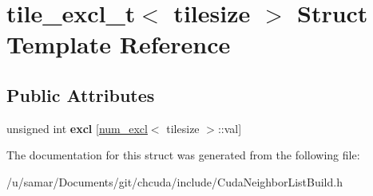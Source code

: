 \hypertarget{structtile__excl__t}{}\section{tile\+\_\+excl\+\_\+t$<$ tilesize $>$ Struct Template Reference}
\label{structtile__excl__t}
\subsection*{Public Attributes}
\begin{DoxyCompactItemize}
\item 
\hypertarget{structtile__excl__t_a3150bae21a288b5f1aaba959b3486d4f}{}\label{structtile__excl__t_a3150bae21a288b5f1aaba959b3486d4f} 
unsigned int {\bfseries excl} \mbox{[}\hyperlink{structnum__excl}{num\+\_\+excl}$<$ tilesize $>$\+::val\mbox{]}
\end{DoxyCompactItemize}


The documentation for this struct was generated from the following file\+:\begin{DoxyCompactItemize}
\item 
/u/samar/\+Documents/git/chcuda/include/Cuda\+Neighbor\+List\+Build.\+h\end{DoxyCompactItemize}
